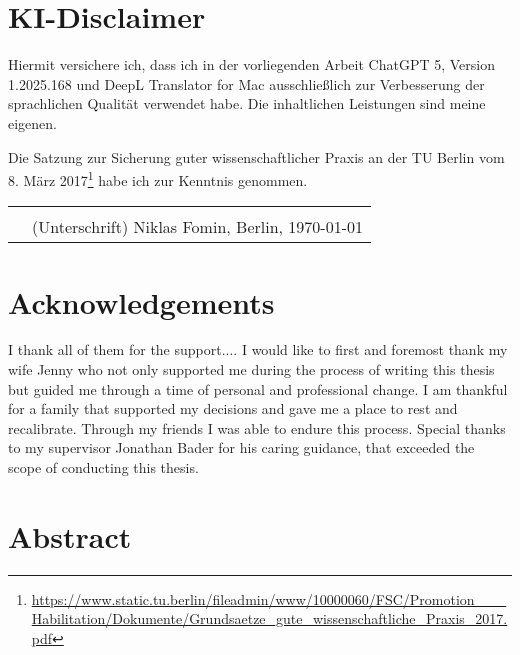 \documentclass[a4paper, 11pt]{article}
\newcommand{\authors}{Niklas Fomin}
\begin{document}

\clearpage
\pagestyle{plain}

\newpage

\section*{KI-Disclaimer}
Hiermit versichere ich, dass ich in der vorliegenden Arbeit ChatGPT 5, Version 1.2025.168 und DeepL Translator for Mac ausschließlich zur Verbesserung der sprachlichen Qualität verwendet habe. Die inhaltlichen Leistungen sind meine eigenen.

Die Satzung zur Sicherung guter wissenschaftlicher Praxis an der TU Berlin vom 8. März 2017\footnote{\url{https://www.static.tu.berlin/fileadmin/www/10000060/FSC/Promotion___Habilitation/Dokumente/Grundsaetze_gute_wissenschaftliche_Praxis_2017.pdf}} habe ich zur Kenntnis genommen.

\vskip 2cm
\begin{tabular}{@{}p{.5in}p{4in}@{}}
     & \hrulefill                              \\
     & (Unterschrift) \authors, Berlin, \today \\
\end{tabular}


\newpage

\section*{Acknowledgements}
I thank all of them for the support....
I would like to first and foremost thank my wife Jenny who not only supported me during the process of writing this thesis but guided me through a time of personal and professional change. I am thankful for a family that supported my decisions and gave me a place to rest and recalibrate. Through my friends I was able to endure this process.
Special thanks to my supervisor Jonathan Bader for his caring guidance, that exceeded the scope of conducting this thesis.



\newpage
\section*{Abstract}
\end{document}
